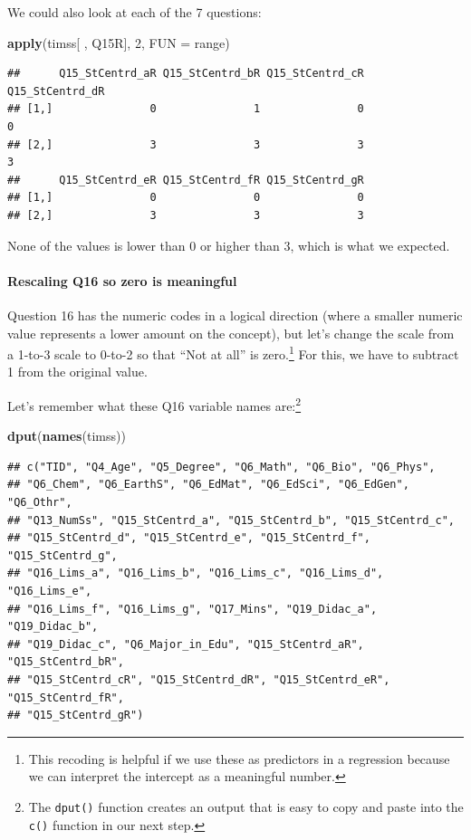 \documentclass[
]{article}
\newenvironment{Shaded}{\begin{snugshade}}{\end{snugshade}}
\newcommand{\DataTypeTok}[1]{\textcolor[rgb]{0.13,0.29,0.53}{#1}}
\newcommand{\DecValTok}[1]{\textcolor[rgb]{0.00,0.00,0.81}{#1}}
\newcommand{\KeywordTok}[1]{\textcolor[rgb]{0.13,0.29,0.53}{\textbf{#1}}}
\newcommand{\NormalTok}[1]{#1}
\begin{document}
We could also look at each of the 7 questions:

\begin{Shaded}
\begin{Highlighting}[]
\KeywordTok{apply}\NormalTok{(timss[ , Q15R], }\DecValTok{2}\NormalTok{, }\DataTypeTok{FUN =}\NormalTok{ range)}
\end{Highlighting}
\end{Shaded}

\begin{verbatim}
##      Q15_StCentrd_aR Q15_StCentrd_bR Q15_StCentrd_cR Q15_StCentrd_dR
## [1,]               0               1               0               0
## [2,]               3               3               3               3
##      Q15_StCentrd_eR Q15_StCentrd_fR Q15_StCentrd_gR
## [1,]               0               0               0
## [2,]               3               3               3
\end{verbatim}

None of the values is lower than 0 or higher than 3, which is what we expected.

\hypertarget{rescaling-q16-so-zero-is-meaningful}{%
\paragraph{Rescaling Q16 so zero is meaningful}\label{rescaling-q16-so-zero-is-meaningful}}

Question 16 has the numeric codes in a logical direction (where a smaller numeric value represents a lower amount on the concept), but let's change the scale from a 1-to-3 scale to 0-to-2 so that ``Not at all'' is zero.\footnote{This recoding is helpful if we use these as predictors in a regression because we can interpret the intercept as a meaningful number.} For this, we have to subtract 1 from the original value.

Let's remember what these Q16 variable names are:\footnote{The \texttt{dput()} function creates an output that is easy to copy and paste into the \texttt{c()} function in our next step.}

\begin{Shaded}
\begin{Highlighting}[]
\KeywordTok{dput}\NormalTok{(}\KeywordTok{names}\NormalTok{(timss)) }
\end{Highlighting}
\end{Shaded}

\begin{verbatim}
## c("TID", "Q4_Age", "Q5_Degree", "Q6_Math", "Q6_Bio", "Q6_Phys", 
## "Q6_Chem", "Q6_EarthS", "Q6_EdMat", "Q6_EdSci", "Q6_EdGen", "Q6_Othr", 
## "Q13_NumSs", "Q15_StCentrd_a", "Q15_StCentrd_b", "Q15_StCentrd_c", 
## "Q15_StCentrd_d", "Q15_StCentrd_e", "Q15_StCentrd_f", "Q15_StCentrd_g", 
## "Q16_Lims_a", "Q16_Lims_b", "Q16_Lims_c", "Q16_Lims_d", "Q16_Lims_e", 
## "Q16_Lims_f", "Q16_Lims_g", "Q17_Mins", "Q19_Didac_a", "Q19_Didac_b", 
## "Q19_Didac_c", "Q6_Major_in_Edu", "Q15_StCentrd_aR", "Q15_StCentrd_bR", 
## "Q15_StCentrd_cR", "Q15_StCentrd_dR", "Q15_StCentrd_eR", "Q15_StCentrd_fR", 
## "Q15_StCentrd_gR")
\end{verbatim}
\end{document}
